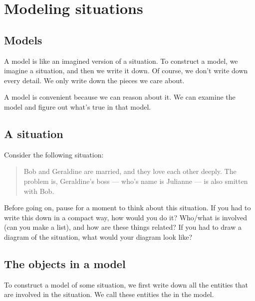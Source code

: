 \documentclass[../../../main.tex]{subfiles}
\begin{document}
\chapter{Modeling situations}


\section{Models}

A model is like an imagined version of a situation. To construct a model, we imagine a situation, and then we write it down. Of course, we don't write down every detail. We only write down the pieces we care about.

A model is convenient because we can reason about it. We can examine the model and figure out what's true in that model.


\section{A situation}

Consider the following situation:

\begin{quote}
  Bob and Geraldine are married, and they love each other deeply. The problem is, Geraldine's boss --- who's name is Julianne --- is also smitten with Bob.
\end{quote}

\noindent
Before going on, pause for a moment to think about this situation. If you had to write this down in a compact way, how would you do it? Who/what is involved (can you make a list), and how are these things related? If you had to draw a diagram of the situation, what would your diagram look like?



\section{The objects in a model}

To construct a model of some situation, we first write down all the entities that are involved in the situation. We call these entities the  in the model. 
\end{document}
